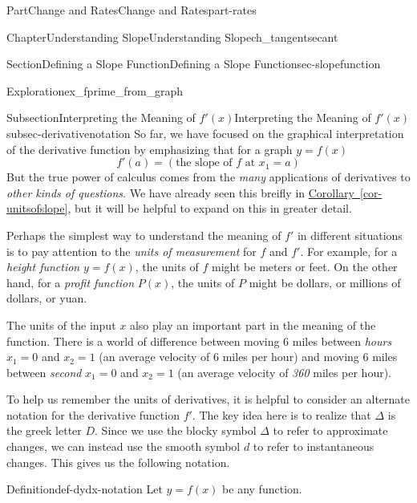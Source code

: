 \documentclass{tufte-book}
\newcommand{\xreffont}{\relax}
\numberwithin{equation}{chapter}
\begin{document}
\begin{partptx}{Part}{Change and Rates}{}{Change and Rates}{}{}{part-rates}
\begin{chapterptx}{Chapter}{Understanding Slope}{}{Understanding Slope}{}{}{ch_tangentsecant}
\begin{sectionptx}{Section}{Defining a Slope Function}{}{Defining a Slope Function}{}{}{sec-slopefunction}
\begin{exploration}{Exploration}{}{ex_fprime_from_graph}
\begin{enumerate}[font=\bfseries,label=(\alph*),ref=\alph*]
\begin{image}{0.125}{0.75}{0.125}{}
{\begin{tikzpicture}
\end{tikzpicture}
}%
\end{image}%
\end{enumerate}%
\end{exploration}%
%
%
\typeout{************************************************}
\typeout{************************************************}
%
\begin{subsectionptx}{Subsection}{Interpreting the Meaning of \(f'(x)\)}{}{Interpreting the Meaning of \(f'(x)\)}{}{}{subsec-derivativenotation}
So far, we have focused on the graphical interpretation of the derivative function by emphasizing that for a graph \(y=f(x)\)%
\begin{equation*}
f'(a) = (\text{the slope of } f \text{ at }x_1=a)
\end{equation*}
But the true power of calculus comes from the \emph{many} applications of derivatives to \emph{other kinds of questions}. We have already seen this breifly in \hyperref[cor-unitsofslope]{Corollary~{\xreffont\ref{cor-unitsofslope}}}, but it will be helpful to expand on this in greater detail.%
\par
Perhaps the simplest way to understand the meaning of \(f'\) in different situations is to pay attention to the \emph{units of measurement} for \(f\) and \(f'\). For example, for a \emph{height function} \(y=f(x)\), the units of \(f\) might be meters or feet. On the other hand, for a \emph{profit function} \(P(x)\), the units of \(P\) might be dollars, or millions of dollars, or yuan.%
\par
The units of the input \(x\) also play an important part in the meaning of the function. There is a world of difference between moving 6 miles between \emph{hours} \(x_1=0\) and \(x_2=1\) (an average velocity of 6 miles per hour) and moving 6 miles between \emph{second} \(x_1=0\) and \(x_2=1\) (an average velocity of \emph{360} miles per hour).%
\par
To help us remember the units of derivatives, it is helpful to consider an alternate notation for the derivative function \(f'\). The key idea here is to realize that \(\Delta\) is the greek letter \(D\).  Since we use the blocky symbol \(\Delta\) to refer to approximate changes, we can instead use the smooth symbol \(d\) to refer to instantaneous changes.  This gives us the following notation.%
\begin{definition}{Definition}{}{def-dydx-notation}%
Let \(y=f(x)\) be any function.%
\par

\end{definition}
\end{subsectionptx}
\end{sectionptx}
\end{chapterptx}
\end{partptx}
\end{document}
